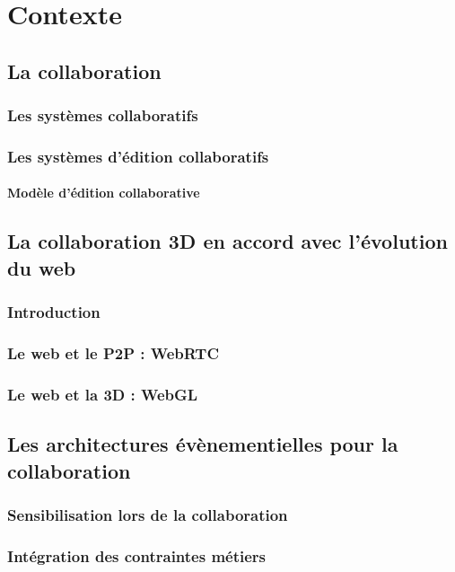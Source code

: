 \documentclass[final,10pt,doubleside]{book}
\begin{document}
	\completetable

\chapter{Contexte}

\section{La collaboration}

	\subsection{Les systèmes collaboratifs}
	\subsection{Les systèmes d'édition collaboratifs}
		\subsubsection{Modèle d'édition collaborative}

\section{La collaboration 3D en accord avec l'évolution du web}

	\subsection{Introduction}
	\subsection{Le web et le P2P : WebRTC}
	\subsection{Le web et la 3D :  WebGL}

\section{Les architectures évènementielles pour la collaboration}
	\subsection{Sensibilisation lors de la collaboration}
	\subsection{Intégration des contraintes métiers}
\end{document}
